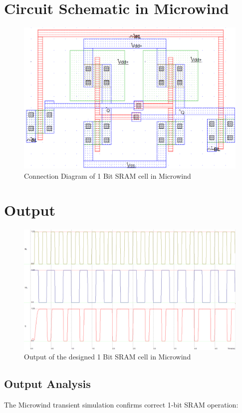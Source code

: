 \documentclass[12pt]{article}
\begin{document}
\section*{Circuit Schematic in Microwind}

\begin{figure}[H]
  \centering
  \includegraphics[width=.9\textwidth]{ckt.png}
  \caption{Connection Diagram of 1 Bit SRAM cell in Microwind}
\end{figure}

\section*{Output}

\begin{figure}[H]
  \centering
  \includegraphics[width=.9\textwidth]{output1.png}
  \caption{Output of the designed 1 Bit SRAM cell in Microwind}
\end{figure}

\subsection*{Output Analysis}
The Microwind transient simulation confirms correct 1‑bit SRAM operation:
\end{document}
